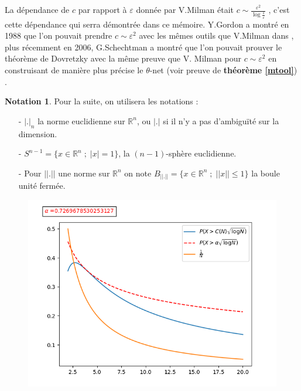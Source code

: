 \documentclass[12pt]{article}
\theoremstyle{definition}
\newtheorem*{notation}{Notation}
\begin{document}
La dépendance de $c$ par rapport à $\varepsilon$ donnée par V.Milman était $c \sim \frac{\varepsilon^2}{\log{\frac{1}{\varepsilon}}}$ \cite{VM1}, c'est cette dépendance qui serra démontrée dans ce mémoire. Y.Gordon a montré en 1988 que l'on pouvait prendre $c\sim \varepsilon^2$ avec les mêmes outils que V.Milman dans \cite{YG}, plus récemment en 2006, G.Schechtman a montré que l'on pouvait prouver le théorème de Dovretzky avec la même preuve que V. Milman pour $c\sim \varepsilon^2$  en construisant de manière plus précise le $\theta$-net \cite{GS2} (voir preuve de \textbf{théorème \ref{mtool}}) .
\newpage\begin{notation}
	Pour la suite, on utilisera les notations : 
	\begin{enumerate}
		\item[-] $|.|_n$ la norme euclidienne sur $\mathbb{R}^n$, ou $|.|$ si il n'y a pas d'ambiguïté sur la dimension.
		\item[-] $S^{n-1} = \big\{x\in \mathbb{R}^n\; ;\; |x|=1\big\}$, la $(n-1)$-sphère euclidienne.
		\item[-] Pour $||.||$ une norme sur $\mathbb{R}^n$ on note $B_{||.||}=\big\{x\in\mathbb{R}^n\;;\;||x||\leq 1\big\}$ la boule unité fermée.
	\end{enumerate}
\end{notation}

\begin{figure}
	\centering
	\includegraphics[scale=0.4]{figure_1.png}
\end{figure}
\end{document}
